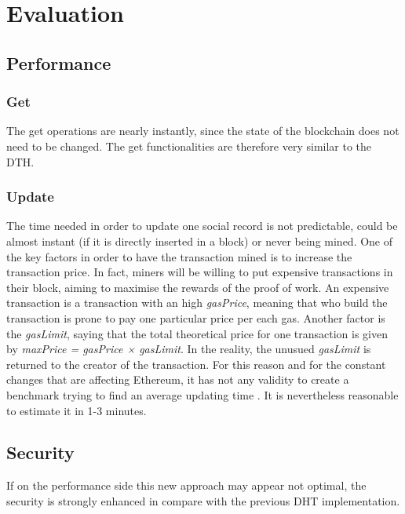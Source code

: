 \chapter{Evaluation}
\label{evaluation}

\section{Performance}

\subsection{Get}
The get operations are nearly instantly, since the state of the blockchain does not need to be changed.
The get functionalities are therefore very similar to the DTH.

\subsection{Update}
The time needed in order to update one social record is not predictable, could be almost instant (if it is directly inserted in a block) or never being mined.
One of the key factors in order to have the transaction mined is to increase the transaction price.
In fact, miners will be willing to put expensive transactions in their block, aiming to maximise the rewards of the proof of work.
An expensive transaction is a transaction with an high \textit{gasPrice}, meaning that who build the transaction is prone to pay one particular price per each gas.
Another factor is the \textit{gasLimit}, saying that the total theoretical price for one transaction is given by \textit{maxPrice = gasPrice × gasLimit}.
In the reality, the unusued \textit{gasLimit} is returned to the creator of the transaction.
For this reason and for the constant changes that are affecting Ethereum, it has not any validity to create a benchmark trying to find an average updating time \cite{miningTime}.
It is nevertheless reasonable to estimate it in 1-3 minutes.

\section{Security}

If on the performance side this new approach may appear not optimal, the security is strongly enhanced in compare with the previous DHT implementation.

